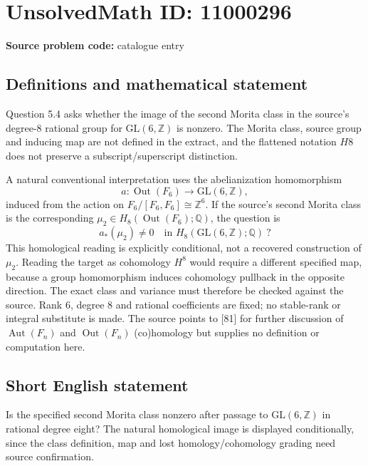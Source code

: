 \documentclass[11pt]{article}
\newcommand{\Z}{\mathbb{Z}}
\newcommand{\Q}{\mathbb{Q}}
\begin{document}
\section*{UnsolvedMath ID: 11000296}
\textbf{Source problem code:} catalogue entry
\subsection{Definitions and mathematical statement}
Question 5.4 asks whether the image of the second Morita class in the source's degree-\(8\) rational group for \(\mathrm{GL}(6,\Z)\) is nonzero. The Morita class, source group and inducing map are not defined in the extract, and the flattened notation \(H8\) does not preserve a subscript/superscript distinction.

A natural conventional interpretation uses the abelianization homomorphism
\[
 a:\operatorname{Out}(F_6)\longrightarrow\mathrm{GL}(6,\Z),
\]
induced from the action on \(F_6/[F_6,F_6]\cong\Z^6\). If the source's second Morita class is the corresponding \(\mu_2\in H_8(\operatorname{Out}(F_6);\Q)\), the question is
\[
 a_*(\mu_2)\ne0\quad\text{in }H_8(\mathrm{GL}(6,\Z);\Q)\ ?
\]
This homological reading is explicitly conditional, not a recovered construction of \(\mu_2\). Reading the target as cohomology \(H^8\) would require a different specified map, because a group homomorphism induces cohomology pullback in the opposite direction. The exact class and variance must therefore be checked against the source. Rank \(6\), degree \(8\) and rational coefficients are fixed; no stable-rank or integral substitute is made. The source points to [81] for further discussion of \(\operatorname{Aut}(F_n)\) and \(\operatorname{Out}(F_n)\) (co)homology but supplies no definition or computation here.
\subsection{Short English statement}
Is the specified second Morita class nonzero after passage to \(\mathrm{GL}(6,\Z)\) in rational degree eight? The natural homological image is displayed conditionally, since the class definition, map and lost homology/cohomology grading need source confirmation.
\end{document}

